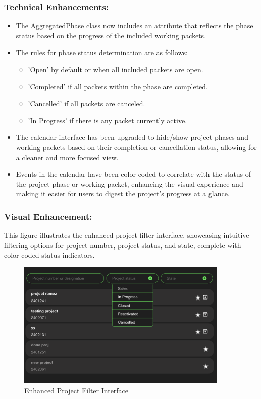 \subsubsection*{Technical Enhancements:}
\begin{itemize}
    \item The AggregatedPhase class now includes an attribute that reflects the phase status based on the progress of the included working packets.
    \item The rules for phase status determination are as follows:
        \begin{itemize}
            \item 'Open' by default or when all included packets are open.
            \item 'Completed' if all packets within the phase are completed.
            \item 'Cancelled' if all packets are canceled.
            \item 'In Progress' if there is any packet currently active.
        \end{itemize}
    \item The calendar interface has been upgraded to hide/show project phases and working packets based on their completion or cancellation status, allowing for a cleaner and more focused view.
    \item Events in the calendar have been color-coded to correlate with the status of the project phase or working packet, enhancing the visual experience and making it easier for users to digest the project's progress at a glance.
\end{itemize}

\subsubsection{Visual Enhancement:}
This figure illustrates the enhanced project filter interface, showcasing intuitive filtering options for project number, project status, and state, complete with color-coded status indicators.

\begin{figure}[H]
    \centering
    \includegraphics[width=0.9\textwidth]{src/assets/chapters/enhanced-project-filter-interface.png}
    \caption{ Enhanced Project Filter Interface}
    \label{fig:enhanced_project_filter_interface}
\end{figure}

